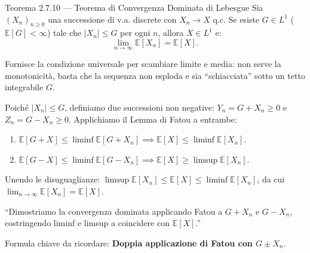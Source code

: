 \documentclass[11pt,a4paper]{report}
\begin{document}
\begin{teoremabox}{Teorema 2.7.10 --- Teorema di Convergenza Dominata di Lebesgue}
Sia $(X_n)_{n \ge 0}$ una successione di v.a. discrete con $X_n \to X$ q.c. Se esiste $G \in L^1$ ($\mathbb{E}[G] < \infty$) tale che $|X_n| \le G$ per ogni $n$, allora $X \in L^1$ e:
\[
\lim_{n \to \infty} \mathbb{E}[X_n] = \mathbb{E}[X].
\]

\begin{cosafa}
Fornisce la condizione universale per scambiare limite e media: non serve la monotonicità, basta che la sequenza non esploda e sia ``schiacciata'' sotto un tetto integrabile $G$.
\end{cosafa}

\begin{dimostrazione}
Poiché $|X_n| \le G$, definiamo due successioni non negative: $Y_n = G + X_n \ge 0$ e $Z_n = G - X_n \ge 0$. Applichiamo il Lemma di Fatou a entrambe:
\begin{enumerate}
    \item $\mathbb{E}[G + X] \le \liminf \mathbb{E}[G + X_n] \implies \mathbb{E}[X] \le \liminf \mathbb{E}[X_n]$.
    \item $\mathbb{E}[G - X] \le \liminf \mathbb{E}[G - X_n] \implies \mathbb{E}[X] \ge \limsup \mathbb{E}[X_n]$.
\end{enumerate}
Unendo le disuguaglianze: $\limsup \mathbb{E}[X_n] \le \mathbb{E}[X] \le \liminf \mathbb{E}[X_n]$, da cui $\lim_{n \to \infty} \mathbb{E}[X_n] = \mathbb{E}[X]$.
\end{dimostrazione}

\begin{oralbox}
``Dimostriamo la convergenza dominata applicando Fatou a $G+X_n$ e $G-X_n$, costringendo liminf e limsup a coincidere con $\mathbb{E}[X]$.''
\end{oralbox}

\begin{tipbox}
Formula chiave da ricordare: \textbf{Doppia applicazione di Fatou con $G \pm X_n$}.
\end{tipbox}
\end{teoremabox}

\vspace{0.3cm}
\end{document}
